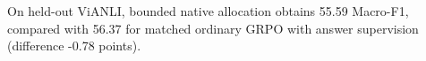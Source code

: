 On held-out ViANLI, bounded native allocation obtains 55.59 Macro-F1, compared with 56.37 for matched ordinary GRPO with answer supervision (difference -0.78 points).
